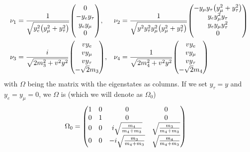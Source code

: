\documentclass[a4paper,11pt]{article} \pdfoutput=1
\begin{document}
\begin{align}
	\nu_{1} & = \frac{1}{\sqrt{y^{2}_{e}\qty(y^{2}_{\mu} + y^{2}_{\tau})}}
	\mqty(0                                                                               \\
	-y_{e}y_{\tau}                                                                        \\
	y_{e}y_{\mu}                                                                          \\
	0),     &
	\nu_{2} & = \frac{1}{\sqrt{y^{2}y_{\tau}^2y_{\mu}^{2}\qty(y_{\mu}^{2}+y_{\tau}^{2})}}
	\mqty(
	-y_{\mu}y_{\tau}\qty(y_{\mu}^{2}+y_{\tau}^{2})                                        \\
	y_{e}y^{2}_{\mu}y_{\tau}                                                              \\
	y_{e}y_{\mu}y^{2}_{\tau}                                                              \\
	0)                                                                                    \\
	\nu_{3} & = \frac{i}{\sqrt{2m^{2}_{3} + v^2y^2}}
	\mqty(
	v y_{e}                                                                               \\
	v y_{\mu}                                                                             \\
	v y_{\tau}                                                                            \\
	-\sqrt{2}m_{3}
	),      &
	\nu_{4} & = \frac{1}{\sqrt{2m^{2}_{4} + v^2y^2}}
	\mqty(
	v y_{e}                                                                               \\
	v y_{\mu}                                                                             \\
	v y_{\tau}                                                                            \\
	-\sqrt{2}m_{4}
	)
\end{align}
with \(\Omega\) being the matrix with the eigenstates as columns. If we set
\(y_{\tau} = y\) and \(y_{e}=y_{\mu}=0\), we \(\Omega\) is (which we will denote
as \(\Omega_{0}\))
\begin{align}
	\Omega_{0}
	  & =
	\mqty(
	1 & 0 & 0                            & 0                           \\
	0 & 1 & 0                            & 0                           \\
	0 & 0 & i\sqrt{\frac{m_4}{m_4+m_3}}  & \sqrt{\frac{m_3}{m_4+m_3}}  \\
	0 & 0 & -i\sqrt{\frac{m_3}{m_4+m_3}} & \sqrt{\frac{m_4}{m_4+m_3}})
\end{align}
\end{document}
